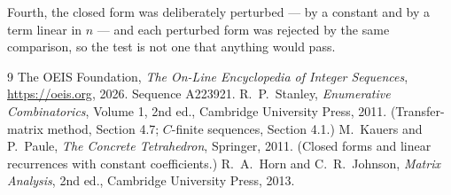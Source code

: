 \documentclass[11pt,a4paper]{article}
\theoremstyle{plain}
\theoremstyle{definition}
\begin{document}
Fourth, the closed form was deliberately perturbed --- by a constant and by a term linear in
$n$ --- and each perturbed form was rejected by the same comparison, so the test is not one
that anything would pass.

\begin{thebibliography}{9}
 The OEIS Foundation, \emph{The On-Line Encyclopedia of Integer
Sequences}, \url{https://oeis.org}, 2026. Sequence A223921.
 R.~P.~Stanley, \emph{Enumerative Combinatorics}, Volume 1, 2nd ed.,
Cambridge University Press, 2011. (Transfer-matrix method, Section 4.7; $C$-finite sequences,
Section 4.1.)
 M.~Kauers and P.~Paule, \emph{The Concrete Tetrahedron}, Springer, 2011.
(Closed forms and linear recurrences with constant coefficients.)
 R.~A.~Horn and C.~R.~Johnson, \emph{Matrix Analysis}, 2nd ed., Cambridge
University Press, 2013.
\end{thebibliography}
\end{document}

